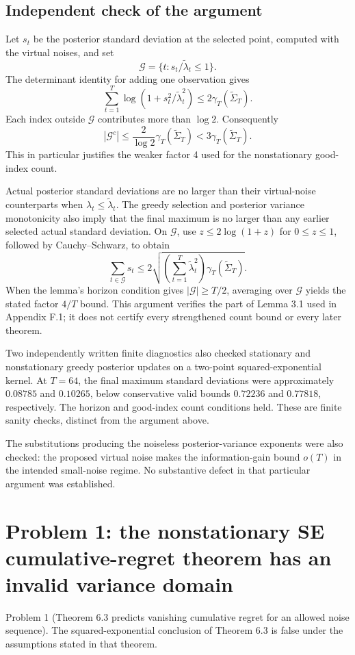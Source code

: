 \documentclass[10pt]{article}
\begin{document}
\subsection*{Independent check of the argument}
Let \(s_t\) be the posterior standard deviation at the selected point, computed with the virtual noises, and set \[\mathcal G=\{t:s_t/\widetilde\lambda_t\le1\}.\] The determinant identity for adding one observation gives \[\sum_{t=1}^T\log(1+s_t^2/\widetilde\lambda_t^2)
 \le2\gamma_T(\widetilde\Sigma_T).\] Each index outside \(\mathcal G\) contributes more than \(\log2\). Consequently \[|\mathcal G^c|
 \le\frac{2}{\log2}\gamma_T(\widetilde\Sigma_T)
 <3\gamma_T(\widetilde\Sigma_T).\] This in particular justifies the weaker factor 4 used for the nonstationary good-index count.\par
Actual posterior standard deviations are no larger than their virtual-noise counterparts when \(\lambda_t\le\widetilde\lambda_t\). The greedy selection and posterior variance monotonicity also imply that the final maximum is no larger than any earlier selected actual standard deviation. On \(\mathcal G\), use \(z\le2\log(1+z)\) for \(0\le z\le1\), followed by Cauchy–Schwarz, to obtain \[\sum_{t\in\mathcal G}s_t
 \le2\sqrt{\left(\sum_{t=1}^T\widetilde\lambda_t^2\right)
                  \gamma_T(\widetilde\Sigma_T)}.\] When the lemma’s horizon condition gives \(|\mathcal G|\ge T/2\), averaging over \(\mathcal G\) yields the stated factor \(4/T\) bound. This argument verifies the part of Lemma 3.1 used in Appendix F.1; it does not certify every strengthened count bound or every later theorem.\par
Two independently written finite diagnostics also checked stationary and nonstationary greedy posterior updates on a two-point squared-exponential kernel. At \(T=64\), the final maximum standard deviations were approximately \(0.08785\) and \(0.10265\), below conservative valid bounds \(0.72236\) and \(0.77818\), respectively. The horizon and good-index count conditions held. These are finite sanity checks, distinct from the argument above.\par
The substitutions producing the noiseless posterior-variance exponents were also checked: the proposed virtual noise makes the information-gain bound \(o(T)\) in the intended small-noise regime. No substantive defect in that particular argument was established.\par
\section*{Problem 1: the nonstationary SE cumulative-regret theorem has an invalid variance domain}
Problem 1 (Theorem 6.3 predicts vanishing cumulative regret for an allowed noise sequence).  The squared-exponential conclusion of Theorem 6.3 is false under the assumptions stated in that theorem.\par
\end{document}
